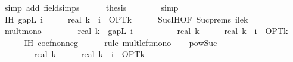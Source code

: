 \begin{isabellebody}
\ {\isacharparenleft}{\kern0pt}simp\ add{\isacharcolon}{\kern0pt}\ field{\isacharunderscore}{\kern0pt}simps{\isacharparenright}{\kern0pt}\isanewline
\ \ \ \ \isamarkupfalse%
\ {\isacharquery}{\kern0pt}thesis\isanewline
\ \ \ \ \ \ \isamarkupfalse%
\ simp\isanewline
\ \ \isamarkupfalse%
\isanewline
\isanewline
\ \ \isamarkupfalse%
\ IH{\isacharcolon}{\kern0pt}\ {\isachardoublequoteopen}gapL\ i\ {\isasymle}\ {\isacharparenleft}{\kern0pt}{}\ {\isacharminus}{\kern0pt}\ {}\ {\isacharslash}{\kern0pt}\ real\ k{\isacharparenright}{\kern0pt}\ {\isacharcircum}{\kern0pt}\ i\ {\isacharasterisk}{\kern0pt}\ OPT{\isacharunderscore}{\kern0pt}k{\isachardoublequoteclose}\isanewline
\ \ \ \ \isamarkupfalse%
\ Suc{\isachardot}{\kern0pt}IH{\isacharbrackleft}{\kern0pt}OF\ Suc{\isachardot}{\kern0pt}prems{\isacharparenleft}{\kern0pt}{}{\isacharparenright}{\kern0pt}\ i{\isacharunderscore}{\kern0pt}le{\isacharunderscore}{\kern0pt}k{\isacharbrackright}{\kern0pt}\ \isakeywordONE{{\isachardot}{\kern0pt}}\isamarkupfalse%
\isanewline
\isanewline
\ \ \isamarkupfalse%
\ mult{\isacharunderscore}{\kern0pt}mono{\isacharcolon}{\kern0pt}\isanewline
\ \ \ \ {\isachardoublequoteopen}{\isacharparenleft}{\kern0pt}{}\ {\isacharminus}{\kern0pt}\ {}\ {\isacharslash}{\kern0pt}\ real\ k{\isacharparenright}{\kern0pt}\ {\isacharasterisk}{\kern0pt}\ gapL\ i\isanewline
\ \ \ \ \ {\isasymle}\ {\isacharparenleft}{\kern0pt}{}\ {\isacharminus}{\kern0pt}\ {}\ {\isacharslash}{\kern0pt}\ real\ k{\isacharparenright}{\kern0pt}\ {\isacharasterisk}{\kern0pt}\ {\isacharparenleft}{\kern0pt}{\isacharparenleft}{\kern0pt}{}\ {\isacharminus}{\kern0pt}\ {}\ {\isacharslash}{\kern0pt}\ real\ k{\isacharparenright}{\kern0pt}\ {\isacharcircum}{\kern0pt}\ i\ {\isacharasterisk}{\kern0pt}\ OPT{\isacharunderscore}{\kern0pt}k{\isacharparenright}{\kern0pt}{\isachardoublequoteclose}\isanewline
\ \ \ \ \isamarkupfalse%
\ IH\ coef{\isacharunderscore}{\kern0pt}nonneg\isanewline
\ \ \ \ \isamarkupfalse%
\ {\isacharparenleft}{\kern0pt}rule\ mult{\isacharunderscore}{\kern0pt}left{\isacharunderscore}{\kern0pt}mono{\isacharparenright}{\kern0pt}\isanewline
\isanewline
\ \ \isamarkupfalse%
\ pow{\isacharunderscore}{\kern0pt}Suc{\isacharcolon}{\kern0pt}\isanewline
\ \ \ \ {\isachardoublequoteopen}{\isacharparenleft}{\kern0pt}{}\ {\isacharminus}{\kern0pt}\ {}\ {\isacharslash}{\kern0pt}\ real\ k{\isacharparenright}{\kern0pt}\ {\isacharasterisk}{\kern0pt}\ {\isacharparenleft}{\kern0pt}{\isacharparenleft}{\kern0pt}{}\ {\isacharminus}{\kern0pt}\ {}\ {\isacharslash}{\kern0pt}\ real\ k{\isacharparenright}{\kern0pt}\ {\isacharcircum}{\kern0pt}\ i\ {\isacharasterisk}{\kern0pt}\ OPT{\isacharunderscore}{\kern0pt}k{\isacharparenright}{\kern0pt}\isanewline

\end{isabellebody}
